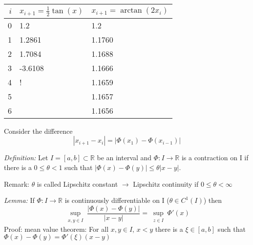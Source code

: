 \begin{center}
    \begin{tabular}{r l l }
        \toprule
        $i$ & $x_{i+1}=\frac{1}{2}\tan(x)$ & $x_{i+1}=\arctan(2x_i)$ \\
        \midrule
        0   & 1.2                          & 1.2                     \\
        1   & 1.2861                       & 1.1760                  \\
        2   & 1.7084                       & 1.1688                  \\
        3   & -3.6108                      & 1.1666                  \\
        4   & {}!                          & 1.1659                  \\
        5   &                              & 1.1657                  \\
        6   &                              & 1.1656                  \\
        \bottomrule
    \end{tabular}
\end{center}
Consider the difference
\begin{equation*}
    |x_{i+1}-x_i| = |\Phi(x_1)-\Phi(x_{i-1})|
\end{equation*}

\emph{Definition:} Let $I=[a,b] \subset \mathbb{R}$ be an interval and $\Phi: I \to \mathbb{R}$ is a contraction on I if there is a $0 \leq \theta < 1$
such that $|\Phi(x)-\Phi(y)| \leq \theta |x-y|$.

Remark: $\theta$ is called Lipschitz constant $\to$ Lipschitz continuity if $0 \leq \theta < \infty$

\vspace{10mm}

\emph{Lemma:} If $\Phi: I \to  \mathbb{R}$ is continuously differentiable on I ($\theta \in C^1(I)$) then
\begin{equation*}
    \sup_{\substack{x,y \in I}} \frac{|\Phi(x)-\Phi(y)|}{|x-y|} = \sup_{\substack{z \in I}} \Phi'(x)
\end{equation*}
Proof: mean value theorem: For all $x,y \in I$, $x<y$ there is a $\xi \in [a,b]$ such that\\
$\Phi(x)-\Phi(y) = \Phi'(\xi)(x-y)$

\vspace{10mm}

